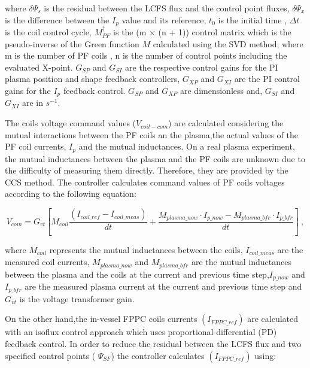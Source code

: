 where $\delta\Psi_s$ is the residual between the  LCFS flux and the control point fluxes,   $\delta\Psi_x$ is the difference between the $I_p$ value and its reference, $t_0$ is the initial time , $\Delta t$ is the coil control cycle, $M^\dagger_{PF}$ is the (m $\times$ (n + 1)) control matrix which is the pseudo-inverse of the Green function $M$ calculated using the SVD method; where m is the number of PF coils , n is the number of control points including the evaluated X-point. $G_{SP}$ and $G_{SI}$ are the respective control gains for the PI plasma position and shape feedback controllers, $ G_{XP}$ and $G_{XI}$ are the PI control gains for the $I_p$ feedback control. $G_{SP}$ and $G_{XP}$ are dimensionless and, $G_{SI}$ and  $G_{XI}$ are in $s^{-1}$. \smallskip



The coils voltage command values ($V_{coil-com}$) are calculated considering the mutual interactions between the PF coils an the plasma,the actual values of the PF coil currents, $I_p$ and the mutual inductances. On a real plasma experiment, the  mutual inductances between the plasma and the PF coils are unknown due to the difficulty of measuring them directly. Therefore, they are provided by the CCS method. The controller calculates command values of PF coils voltages according to the following equation:



\begin{equation}
V_{com}=G_{vt}\left[M_{coil}\frac{(I_{coil\_ref}-I_{coil\_meas})}{dt}+ \frac{M_{plasma\_now} \cdot I_{p\_now} - M_{plasma\_ bfr} \cdot I_{p\_bfr}}{dt}\right]~,
\end{equation}

where $M_{coil} $ represents the mutual inductances between the coils, $I_{coil\_meas}  $ are the measured coil currents,  $M_{plasma\_now}$ and $ M_{plasma\_ bfr}$ are the mutual inductances between the plasma and the coils at the current and previous time step,$  I_{p\_now} $  and  $ I_{p\_bfr} $ are the measured plasma current at the current and previous time step  and $ G_{vt} $ is the voltage transformer gain.
\smallskip

On the other hand,the in-vessel FPPC coils currents $ (I_{FPPC\_ref})  $ are calculated with an isoflux control approach which uses proportional-differential (PD) feedback control. In order to reduce  the residual between the LCFS flux and two specified control points ( $ \Psi_{SF} $)  the controller calculates  $ (I_{FPPC\_ref})  $ using:

